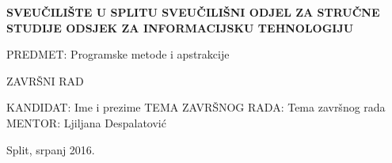 %
%
\begin{titlepage}
\bfseries
\headerdata
{SVEUČILIŠTE U SPLITU}
{SVEUČILIŠNI ODJEL ZA STRUČNE STUDIJE}
{ODSJEK ZA INFORMACIJSKU TEHNOLOGIJU}

\vspace*{5cm}
\begin{flushleft}
{\Large   PREDMET: Programske metode i apstrakcije}
\end{flushleft}
\vspace*{3cm}
\begin{center}
{\Large  ZAVRŠNI RAD}
\end{center}
\vspace*{2cm}

\thesisdata
{KANDIDAT: Ime i prezime}  
{TEMA ZAVRŠNOG RADA: Tema završnog rada}
{MENTOR: Ljiljana Despalatović}

\begin{center}
\vfill
{\large Split, srpanj 2016.}
\end{center}
\end{titlepage}
%
%